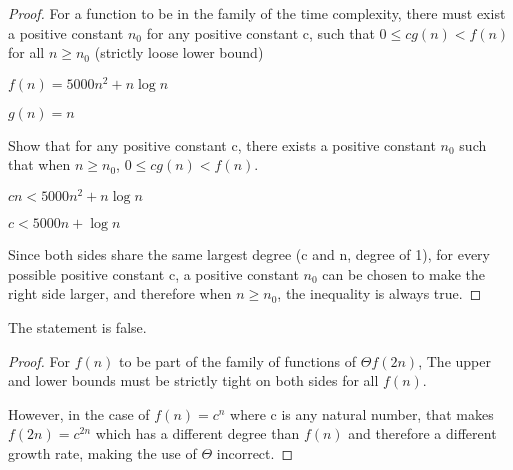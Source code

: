 \documentclass[11pt]{article}
\begin{document}
\begin{proof} For a function to be in the family of the time complexity, there must exist a positive constant $n_0$ for any positive constant c, such that $0\leq cg(n)<f(n)$ for all $n\geq n_0$ (strictly loose lower bound)

$f(n)=5000n^2+n\log n$

$g(n)=n$

Show that for any positive constant c, there exists a positive constant $n_0$ such that when $n\geq n_0$, $0\leq cg(n)<f(n)$.

$cn<5000n^2+n\log n$

$c<5000n+\log n$

Since both sides share the same largest degree (c and n, degree of 1), for every possible positive constant c, a positive constant $n_0$ can be chosen to make the right side larger, and therefore when $n\geq n_0$, the inequality is always true.
\end{proof}

\bigskip


The statement is false.

\begin{proof} For $f(n)$ to be part of the family of functions of $\Theta f(2n)$, The upper and lower bounds must be strictly tight on both sides for all $f(n)$.

However, in the case of $f(n)=c^n$ where c is any natural number, that makes $f(2n)=c^{2n}$ which has a different degree than $f(n)$ and therefore a different growth rate, making the use of $\Theta$ incorrect.
\end{proof}

\bigskip

\end{document}
